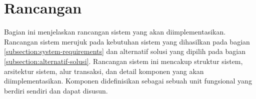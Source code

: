 \section{Rancangan}

Bagian ini menjelaskan rancangan sistem yang akan diimplementasikan. Rancangan sistem merujuk pada kebutuhan sistem yang dihasilkan pada bagian \ref{subsection:system-requirements} dan alternatif solusi yang dipilih pada bagian \ref{subsection:alternatif-solusi}. Rancangan sistem ini mencakup struktur sistem, arsitektur sistem, alur transaksi, dan detail komponen yang akan diimplementasikan. Komponen didefinisikan sebagai sebuah unit fungsional yang berdiri sendiri dan dapat disusun.






